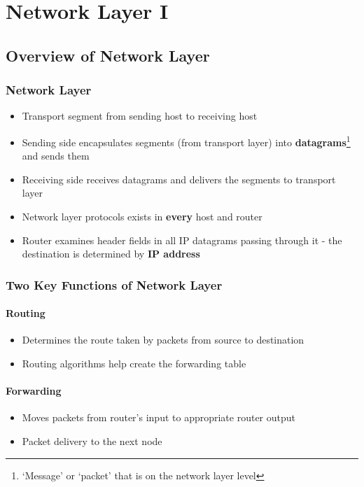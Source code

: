 \section{Network Layer I}
\subsection{Overview of Network Layer}
\subsubsection{Network Layer}
\begin{itemize}
	\item Transport segment from sending host to receiving host
	\item Sending side encapsulates segments (from transport layer) into \textbf{datagrams}\footnote{`Message' or `packet' that is on the network layer level} and sends them
	\item Receiving side receives datagrams and delivers the segments to transport layer
	\item Network layer protocols exists in \textbf{every} host and router
	\item Router examines header fields in all IP datagrams passing through it - the destination is determined by \textbf{IP address}
\end{itemize}

\subsubsection{Two Key Functions of Network Layer}
\paragraph{Routing}
\begin{itemize}
	\item Determines the route taken by packets from source to destination
	\item Routing algorithms help create the forwarding table
\end{itemize}

\paragraph{Forwarding}
\begin{itemize}
	\item Moves packets from router's input to appropriate router output
	\item Packet delivery to the next node
\end{itemize}

